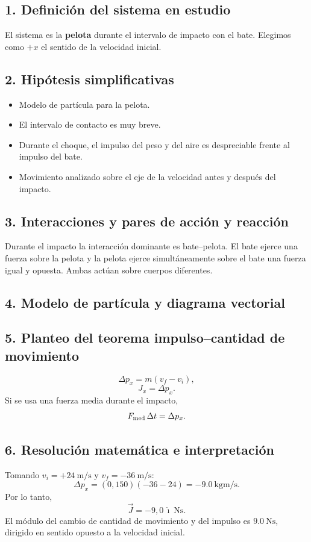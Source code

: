 \documentclass[12pt]{article}
\newcommand{\paso}[2]{%
  \subsection*{\color{AzulFisica}#1. #2}%
}
\begin{document}
\paso{1}{Definición del sistema en estudio}
El sistema es la \textbf{pelota} durante el intervalo de impacto con el bate. Elegimos como $+x$ el sentido de la velocidad inicial.

\paso{2}{Hipótesis simplificativas}
\begin{itemize}[itemsep=2pt]
  \item Modelo de partícula para la pelota.
  \item El intervalo de contacto es muy breve.
  \item Durante el choque, el impulso del peso y del aire es despreciable frente al impulso del bate.
  \item Movimiento analizado sobre el eje de la velocidad antes y después del impacto.
\end{itemize}

\paso{3}{Interacciones y pares de acción y reacción}
Durante el impacto la interacción dominante es bate--pelota. El bate ejerce una fuerza sobre la pelota y la pelota ejerce simultáneamente sobre el bate una fuerza igual y opuesta. Ambas actúan sobre cuerpos diferentes.

\paso{4}{Modelo de partícula y diagrama vectorial}
\begin{center}
\end{center}

\paso{5}{Planteo del teorema impulso--cantidad de movimiento}
\[
\Delta p_x=m(v_f-v_i),
\]
\[
J_x=\Delta p_x.
\]
Si se usa una fuerza media durante el impacto,
\[
F_{\rm med}\,\Delta t=\Delta p_x.
\]

\paso{6}{Resolución matemática e interpretación}
Tomando $v_i=+\SI{24}{\meter\per\second}$ y $v_f=-\SI{36}{\meter\per\second}$:
\[
\Delta p_x=(0,150)(-36-24)=-\SI{9.0}{\kilogram\meter\per\second}.
\]
Por lo tanto,
\[
\boxed{\vec J=-9,0\,\hat\imath\ \si{\newton\second}}.
\]
El módulo del cambio de cantidad de movimiento y del impulso es $\SI{9.0}{\newton\second}$, dirigido en sentido opuesto a la velocidad inicial.
\end{document}
